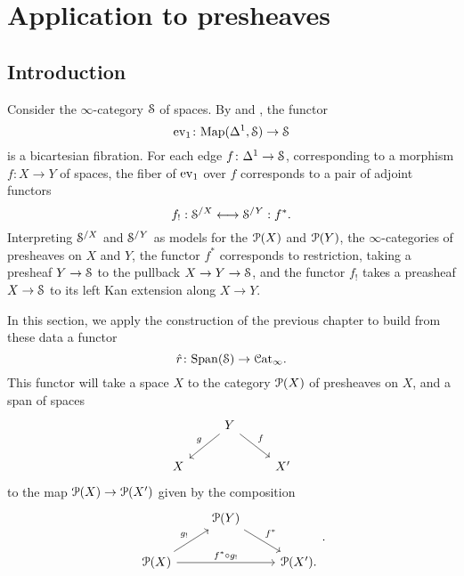 \documentclass[main.tex]{subfiles}
\begin{document}
\section{Application to presheaves}
\label{sec:application_to_presheaves}

\subsection{Introduction}
\label{ssc:introduction}

Consider the $\infty$-category $\S$ of spaces. By \cite[Lemma 6.1.1.1]{highertopostheory} and \cite[Lemma 2.4.7.12]{highertopostheory}, the functor
\begin{equation}
  \label{eq:ev1}
  \ev_{1}\colon \Map(\Delta^{1}, \S) \to \S
\end{equation}
is a bicartesian fibration. For each edge $f\colon \Delta^{1} \to \S$, corresponding to a morphism $f\colon X \to Y$ of spaces, the fiber of $\ev_{1}$ over $f$ corresponds to a pair of adjoint functors
\begin{equation*}
  f_{!} : \S^{/X} \longleftrightarrow \S^{/Y} : f^{*}.
\end{equation*}
Interpreting $\S^{/X}$ and $\S^{/Y}$ as models for the $\P(X)$ and $\P(Y)$, the $\infty$-categories of presheaves on $X$ and $Y$, the functor $f^{*}$ corresponds to restriction, taking a presheaf $Y \to \S$ to the pullback $X \to Y \to \S$, and the functor $f_{!}$ takes a preasheaf $X \to \S$ to its left Kan extension along $X \to Y$.

In this section, we apply the construction of the previous chapter to build from these data a functor
\begin{equation}
  \label{eq:rhat}
  \hat{r}\colon \Span(\S) \to \ICat.
\end{equation}
This functor will take a space $X$ to the category $\P(X)$ of presheaves on $X$, and a span of spaces
\begin{equation*}
  \begin{tikzcd}
    & Y
    \arrow[dl, swap, "g"]
    \arrow[dr, "f"]
    \\
    X
    && X'
  \end{tikzcd}
\end{equation*}
to the map $\P(X) \to \P(X')$ given by the composition
\begin{equation*}
  \begin{tikzcd}
    & \P(Y)
    \arrow[dr, "f^{*}"]
    \\
    \P(X)
    \arrow[ur, "g_{!}"]
    \arrow[rr, "f^{*} \circ g_{!}"]
    && \P(X').
  \end{tikzcd}.
\end{equation*}
\end{document}
